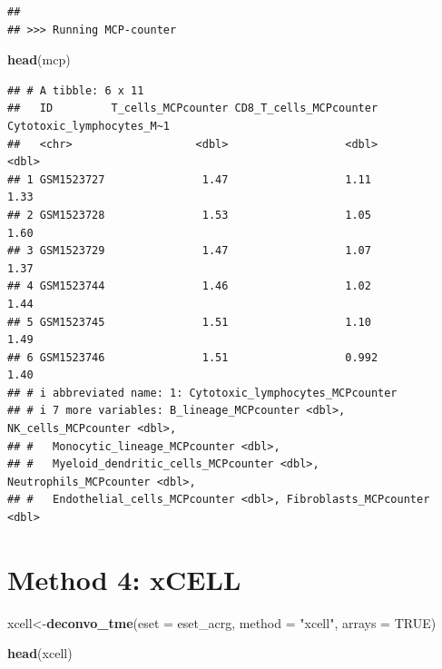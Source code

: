\documentclass[
  12pt,
]{book}
\newenvironment{Shaded}{\begin{snugshade}}{\end{snugshade}}
\newcommand{\AttributeTok}[1]{\textcolor[rgb]{0.13,0.29,0.53}{#1}}
\newcommand{\ConstantTok}[1]{\textcolor[rgb]{0.56,0.35,0.01}{#1}}
\newcommand{\FunctionTok}[1]{\textcolor[rgb]{0.13,0.29,0.53}{\textbf{#1}}}
\newcommand{\NormalTok}[1]{#1}
\newcommand{\OtherTok}[1]{\textcolor[rgb]{0.56,0.35,0.01}{#1}}
\newcommand{\StringTok}[1]{\textcolor[rgb]{0.31,0.60,0.02}{#1}}
\begin{document}
\begin{verbatim}
## 
## >>> Running MCP-counter
\end{verbatim}

\begin{Shaded}
\begin{Highlighting}[]
\FunctionTok{head}\NormalTok{(mcp)}
\end{Highlighting}
\end{Shaded}

\begin{verbatim}
## # A tibble: 6 x 11
##   ID         T_cells_MCPcounter CD8_T_cells_MCPcounter Cytotoxic_lymphocytes_M~1
##   <chr>                   <dbl>                  <dbl>                     <dbl>
## 1 GSM1523727               1.47                  1.11                       1.33
## 2 GSM1523728               1.53                  1.05                       1.60
## 3 GSM1523729               1.47                  1.07                       1.37
## 4 GSM1523744               1.46                  1.02                       1.44
## 5 GSM1523745               1.51                  1.10                       1.49
## 6 GSM1523746               1.51                  0.992                      1.40
## # i abbreviated name: 1: Cytotoxic_lymphocytes_MCPcounter
## # i 7 more variables: B_lineage_MCPcounter <dbl>, NK_cells_MCPcounter <dbl>,
## #   Monocytic_lineage_MCPcounter <dbl>,
## #   Myeloid_dendritic_cells_MCPcounter <dbl>, Neutrophils_MCPcounter <dbl>,
## #   Endothelial_cells_MCPcounter <dbl>, Fibroblasts_MCPcounter <dbl>
\end{verbatim}

\hypertarget{method-4-xcell}{%
\section{Method 4: xCELL}\label{method-4-xcell}}

\begin{Shaded}
\begin{Highlighting}[]
\NormalTok{xcell}\OtherTok{\textless{}{-}}\FunctionTok{deconvo\_tme}\NormalTok{(}\AttributeTok{eset =}\NormalTok{ eset\_acrg, }\AttributeTok{method =} \StringTok{"xcell"}\NormalTok{, }\AttributeTok{arrays =} \ConstantTok{TRUE}\NormalTok{)}
\end{Highlighting}
\end{Shaded}

\begin{Shaded}
\begin{Highlighting}[]
\FunctionTok{head}\NormalTok{(xcell)}
\end{Highlighting}
\end{Shaded}
\end{document}
